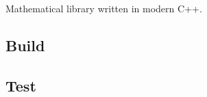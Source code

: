 Mathematical library written in modern C++.

\subsection*{Build}


\begin{DoxyCode}{0}
\end{DoxyCode}


\subsection*{Test}


\begin{DoxyCode}{0}
\end{DoxyCode}
 